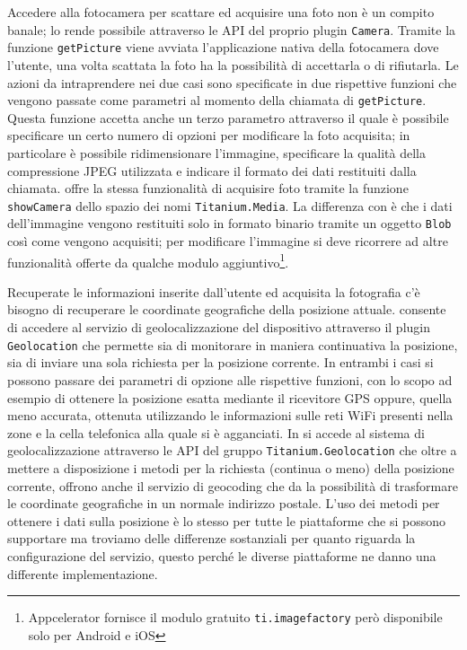             Accedere alla fotocamera per scattare ed acquisire una foto non è un
            compito banale; \pg{} lo rende possibile attraverso le API del
            proprio plugin \texttt{Camera}. Tramite la funzione
            \texttt{getPicture} viene avviata l'applicazione nativa della
            fotocamera dove l'utente, una volta scattata la foto ha la
            possibilità di accettarla o di rifiutarla. Le azioni da
            intraprendere nei due casi sono specificate in due rispettive
            funzioni \js{} che vengono passate come parametri al momento della
            chiamata di \texttt{getPicture}. Questa funzione accetta anche
            un terzo parametro attraverso il quale è possibile specificare un
            certo numero di opzioni
            per modificare la foto acquisita; in particolare è
            possibile ridimensionare l'immagine, specificare la qualità della
            compressione JPEG utilizzata e indicare il formato dei dati
            restituiti dalla chiamata. \tisdk{} offre la stessa funzionalità di
            acquisire foto tramite la funzione \texttt{showCamera} dello spazio
            dei nomi \texttt{Titanium.Media}. La differenza con \pg{} è che i
            dati dell'immagine vengono restituiti solo in formato binario
            tramite un oggetto \js{} \texttt{Blob} così come vengono acquisiti;
            per modificare l'immagine si deve ricorrere ad altre funzionalità
            offerte da qualche modulo aggiuntivo\footnote{Appcelerator
            fornisce il modulo gratuito \texttt{ti.imagefactory} però
            disponibile solo per Android e iOS}.

            Recuperate le informazioni inserite dall'utente ed acquisita la
            fotografia c'è bisogno di recuperare le coordinate geografiche della
            posizione attuale. \pg{} consente di accedere al servizio di
            geolocalizzazione del dispositivo attraverso il plugin
            \texttt{Geolocation} che permette sia di monitorare in maniera
            continuativa la posizione, sia di inviare una sola richiesta per la
            posizione corrente. In entrambi i casi si possono passare dei
            parametri di opzione alle rispettive funzioni, con lo scopo ad
            esempio di
            ottenere la posizione esatta mediante il ricevitore GPS oppure,
            quella meno accurata, ottenuta utilizzando
            le informazioni sulle reti WiFi presenti nella zone e la
            cella telefonica alla quale si è agganciati. In \tisdk{} si accede al sistema di
            geolocalizzazione attraverso le API del gruppo
            \texttt{Titanium.Geolocation} che oltre a mettere a disposizione i
            metodi per la richiesta (continua o meno) della posizione corrente,
            offrono anche il servizio di geocoding che da la possibilità di
            trasformare le coordinate geografiche in un
            normale indirizzo postale. L'uso dei metodi per ottenere i dati
            sulla posizione è lo stesso per tutte le piattaforme che si possono
            supportare ma troviamo delle differenze sostanziali per quanto
            riguarda la configurazione del servizio, questo perché le diverse
            piattaforme ne danno una differente implementazione.

